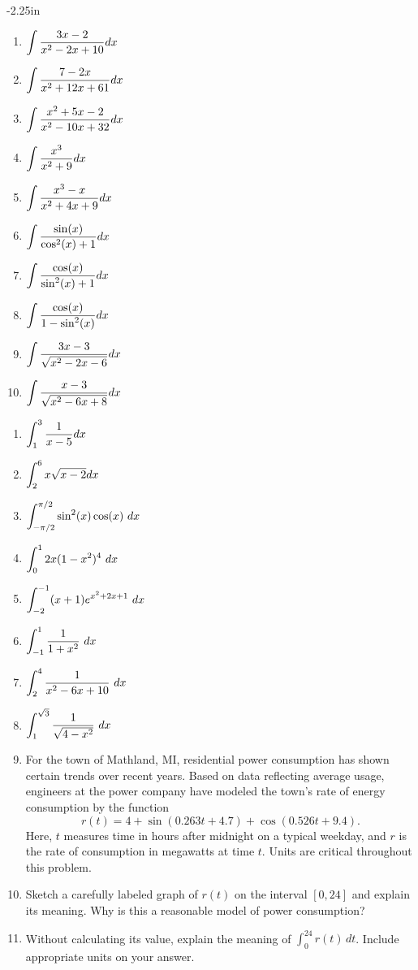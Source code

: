 \begin{adjustwidth*}{}{-2.25in}
\begin{multicols*}{2}
\begin{enumerate}[1),resume]
\item $\displaystyle \int \frac{3 x-2}{x^2-2 x+10} dx $
\item $\displaystyle \int \frac{7-2 x}{x^2+12 x+61} dx $
\item $\displaystyle \int \frac{x^2+5 x-2}{x^2-10 x+32} dx $
\item $\displaystyle \int \frac{x^3}{x^2+9} dx $
\item $\displaystyle \int \frac{x^3-x}{x^2+4 x+9} dx $
\item $\displaystyle \int \frac{\sin (x)}{\cos ^2(x)+1} dx $
\item $\displaystyle \int \frac{\cos (x)}{\sin ^2(x)+1} dx $
\item $\displaystyle \int \frac{\cos (x)}{1-\sin ^2(x)} dx $
\item $\displaystyle \int \frac{3 x-3}{\sqrt{x^2-2 x-6}} dx $
\item $\displaystyle \int \frac{x-3}{\sqrt{x^2-6 x+8}} dx $
\end{enumerate}


\begin{enumerate}[1),resume]
\item $\displaystyle \int_1^3 \frac{1}{x-5} dx $
\item $\displaystyle \int_2^6 x\sqrt{x-2} dx $
\item $\displaystyle \int_{-\pi/2}^{\pi/2} \sin^2(x) \cos (x)\ dx $
\item $\ds \int_{0}^{1} 2x(1-x^2)^4\ dx $
\item $\ds \int_{-2}^{-1} (x+1)e^{x^2+2x+1}\ dx $
\item $\ds \int_{-1}^{1} \frac{1}{1+x^2}\ dx $
\item $\ds \int_{2}^{4} \frac{1}{x^2-6x+10}\ dx $
\item $\displaystyle \int_{1}^{\sqrt{3}} \frac{1}{\sqrt{4-x^2}}\ dx $

  \item For the town of Mathland, MI, residential power consumption has shown certain trends over recent years.  Based on data reflecting average usage, engineers at the power company have modeled the town's rate of energy consumption by the function
 $$r(t) = 4 + \sin(0.263t + 4.7) + \cos(0.526t+9.4).$$
Here, $t$ measures time in hours after midnight on a typical weekday, and $r$ is the rate of consumption in megawatts at time $t$. %
Units are critical throughout this problem.
	\ba
		\item Sketch a carefully labeled graph of $r(t)$ on the interval $[0,24]$ and explain its meaning.  Why is this a reasonable model of power consumption?
		\item Without calculating its value, explain the meaning of $\int_0^{24} r(t) \, dt$.   Include appropriate units on your answer.
		

\end{enumerate}
\end{multicols*}
\end{adjustwidth*}
